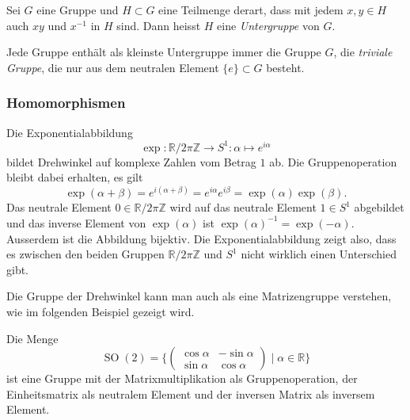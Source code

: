 \begin{definition}
\label{buch:gruppen:definition:def:untergruppe}
Sei $G$ eine Gruppe und $H\subset G$ eine Teilmenge derart,
dass mit jedem $x,y\in H$ auch $xy$ und $x^{-1}$ in $H$ sind.
Dann heisst $H$ eine {\em Untergruppe} von $G$.
%
\end{definition}

Jede Gruppe enthält als kleinste Untergruppe immer die Gruppe $G$,
die {\em triviale Gruppe}, die nur aus dem neutralen Element
$\{e\}\subset G$ besteht.

%
%
\subsubsection{Homomorphismen}
Die Exponentialabbildung
\[
\exp
\colon
\mathbb{R}/2\pi\mathbb{Z} \to S^1
:
\alpha \mapsto e^{i\alpha}
\]
bildet Drehwinkel auf komplexe Zahlen vom Betrag $1$ ab.
Die Gruppenoperation bleibt dabei erhalten, es gilt
\[
\exp(\alpha + \beta)
=
e^{i(\alpha+\beta)}
=
e^{i\alpha}
e^{i\beta}
=
\exp(\alpha)
\exp(\beta).
\]
Das neutrale Element $0\in\mathbb{R}/2\pi\mathbb{Z}$ wird auf
das neutrale Element $1\in S^1$ abgebildet und das inverse
Element von $\exp(\alpha)$ ist
$ \exp(\alpha)^{-1} = \exp(-\alpha) $.
Ausserdem ist die Abbildung bijektiv.
Die Exponentialabbildung zeigt also, dass es zwischen den beiden
Gruppen $\mathbb{R}/2\pi\mathbb{Z}$ und $S^1$ nicht wirklich einen
Unterschied gibt.

Die Gruppe der Drehwinkel kann man auch als eine Matrizengruppe
verstehen, wie im folgenden Beispiel gezeigt wird.

\begin{beispiel}
Die Menge
\[
\operatorname{SO}(2)
=
\biggl\{
\begin{pmatrix}
\cos\alpha & -\sin\alpha \\
\sin\alpha &  \cos\alpha
\end{pmatrix}
\;
\bigg|
\;
\alpha\in\mathbb{R}
\biggr\}
\]
ist eine Gruppe mit der Matrixmultiplikation als Gruppenoperation,
der Einheitsmatrix als neutralem Element und der inversen Matrix
als inversem Element.
\end{beispiel}

